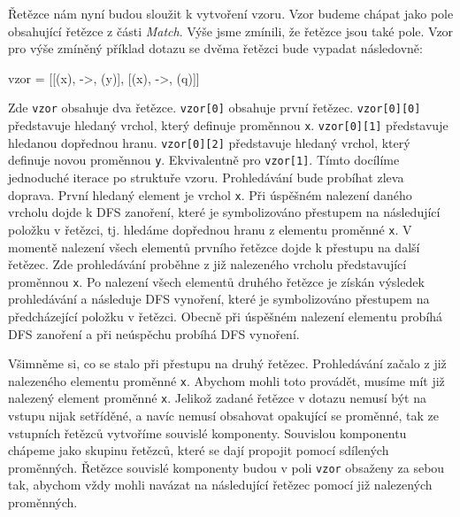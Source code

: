 Řetězce nám nyní budou sloužit k vytvoření vzoru.
Vzor budeme chápat jako pole obsahující řetězce z části \textit{Match}.
Výše jsme zmínili, že řetězce jsou také pole.
Vzor pro výše zmíněný příklad dotazu se dvěma řetězci bude vypadat následovně:
\begin{code}
vzor = [[(x), ->, (y)], [(x), ->, (q)]]
\end{code}
Zde \texttt{vzor} obsahuje dva řetězce.
\texttt{vzor[0]} obsahuje první řetězec.
\texttt{vzor[0][0]} představuje hledaný vrchol, který definuje proměnnou \texttt{x}.
\texttt{vzor[0][1]} představuje hledanou dopřednou hranu.
\texttt{vzor[0][2]} představuje hledaný vrchol, který definuje novou proměnnou \texttt{y}.
Ekvivalentně pro \texttt{vzor[1]}.
Tímto docílíme jednoduché iterace po struktuře vzoru.
Prohledávání bude probíhat zleva doprava.
První hledaný element je vrchol \texttt{x}.
Při úspěšném nalezení daného vrcholu dojde k DFS zanoření, které je symbolizováno přestupem na následující položku v řetězci, tj. hledáme dopřednou hranu z elementu proměnné \texttt{x}.
V momentě nalezení všech elementů prvního řetězce dojde k přestupu na další řetězec.
Zde prohledávání proběhne z již nalezeného vrcholu představující proměnnou \texttt{x}.
Po nalezení všech elementů druhého řetězce je získán výsledek prohledávání a následuje DFS vynoření, které je symbolizováno přestupem na předcházející položku v řetězci.
Obecně při úspěšném nalezení elementu probíhá DFS zanoření a při neúspěchu probíhá DFS vynoření.

Všimněme si, co se stalo při přestupu na druhý řetězec.
Prohledávání začalo z již nalezeného elementu proměnné \texttt{x}.
Abychom mohli toto provádět, musíme mít již nalezený element proměnné \texttt{x}.
Jelikož zadané řetězce v dotazu nemusí být na vstupu nijak setříděné, a navíc nemusí obsahovat opakující se proměnné, tak ze vstupních řetězců vytvoříme souvislé komponenty.
Souvislou komponentu chápeme jako skupinu řetězců, které se dají propojit pomocí sdílených proměnných.
Řetězce souvislé komponenty budou v poli \texttt{vzor} obsaženy za sebou tak, abychom vždy mohli navázat na následující řetězec pomocí již nalezených proměnných.

